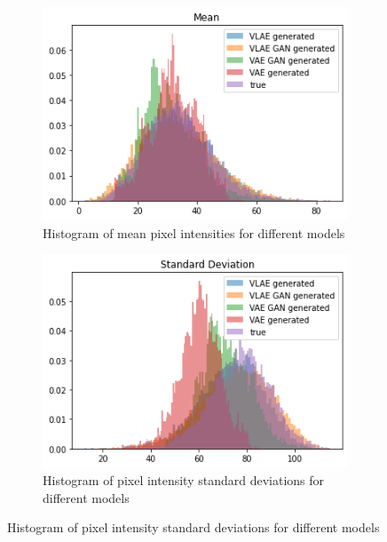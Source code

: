 \begin{figure}
    \centering
    \begin{subfigure}{0.4\textwidth}
        \centering
        \includegraphics[width=\textwidth]{images/generated_vs_true/mnist/mnist_vs_models_mean.png}
        \caption{Histogram of mean pixel intensities for different models}
        \label{subfig:mean_generated_vs_true}
    \end{subfigure}
    \hfill
    \begin{subfigure}{0.4\textwidth}
        \centering
        \includegraphics[width=\textwidth]{images/generated_vs_true/mnist/mnist_vs_models_sd.png}
        \caption{Histogram of pixel intensity standard deviations for different models}
        \label{subfig:sd_generated_vs_true}
    \end{subfigure}
    \hfill

\end{figure}

